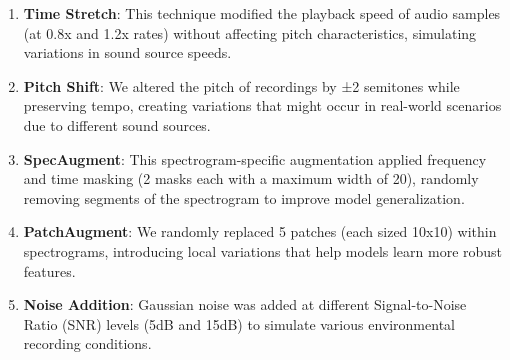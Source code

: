 \documentclass[11pt]{article}
\begin{document}
\begin{enumerate}
    \item \textbf{Time Stretch}: This technique modified the playback speed of audio samples (at 0.8x and 1.2x rates) without affecting pitch characteristics, simulating variations in sound source speeds.
    \item \textbf{Pitch Shift}: We altered the pitch of recordings by ±2 semitones while preserving tempo, creating variations that might occur in real-world scenarios due to different sound sources.
    \item \textbf{SpecAugment}: This spectrogram-specific augmentation applied frequency and time masking (2 masks each with a maximum width of 20), randomly removing segments of the spectrogram to improve model generalization.
    \item \textbf{PatchAugment}: We randomly replaced 5 patches (each sized 10x10) within spectrograms, introducing local variations that help models learn more robust features.
    \item \textbf{Noise Addition}: Gaussian noise was added at different Signal-to-Noise Ratio (SNR) levels (5dB and 15dB) to simulate various environmental recording conditions.
\end{enumerate}
\end{document}
